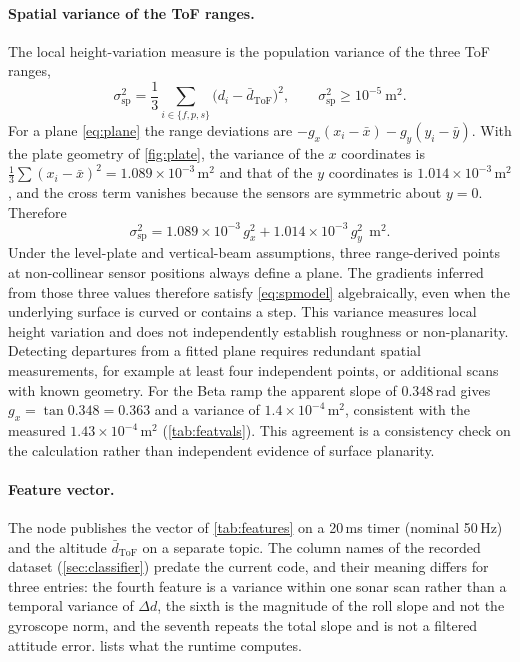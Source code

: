 \documentclass[11pt,a4paper]{article}
\begin{document}
\paragraph{Spatial variance of the ToF ranges.} The local height-variation measure is the population variance of the three ToF ranges,
\begin{equation}
\sigma^2_{\mathrm{sp}}=\frac13\sum_{i\in\{f,p,s\}}\bigl(d_i-\bar d_{\mathrm{ToF}}\bigr)^2,\qquad\sigma^2_{\mathrm{sp}}\ge10^{-5}\ \mathrm{m^2}.
\label{eq:spvar}
\end{equation}
For a plane \eqref{eq:plane} the range deviations are $-g_x(x_i-\bar x)-g_y(y_i-\bar y)$. With the plate geometry of \cref{fig:plate}, the variance of the $x$ coordinates is $\tfrac13\sum(x_i-\bar x)^2=1.089\times10^{-3}$\,m$^2$ and that of the $y$ coordinates is $1.014\times10^{-3}$\,m$^2$, and the cross term vanishes because the sensors are symmetric about $y=0$. Therefore
\begin{equation}
\sigma^2_{\mathrm{sp}}=1.089\times10^{-3}\,g_x^2+1.014\times10^{-3}\,g_y^2\ \ \mathrm{m^2}.
\label{eq:spmodel}
\end{equation}
Under the level-plate and vertical-beam assumptions, three range-derived points at non-collinear sensor positions always define a plane. The gradients inferred from those three values therefore satisfy \eqref{eq:spmodel} algebraically, even when the underlying surface is curved or contains a step. This variance measures local height variation and does not independently establish roughness or non-planarity. Detecting departures from a fitted plane requires redundant spatial measurements, for example at least four independent points, or additional scans with known geometry. For the Beta ramp the apparent slope of $0.348$\,rad gives $g_x=\tan0.348=0.363$ and a variance of $1.4\times10^{-4}$\,m$^2$, consistent with the measured $1.43\times10^{-4}$\,m$^2$ (\cref{tab:featvals}). This agreement is a consistency check on the calculation rather than independent evidence of surface planarity.
 
\paragraph{Feature vector.} The node publishes the vector of \cref{tab:features} on a 20\,ms timer (nominal 50\,Hz) and the altitude $\bar d_{\mathrm{ToF}}$ on a separate topic. The column names of the recorded dataset (\cref{sec:classifier}) predate the current code, and their meaning differs for three entries: the fourth feature is a variance within one sonar scan rather than a temporal variance of $\Delta d$, the sixth is the magnitude of the roll slope and not the gyroscope norm, and the seventh repeats the total slope and is not a filtered attitude error.  lists what the runtime computes.
 
\end{document}
